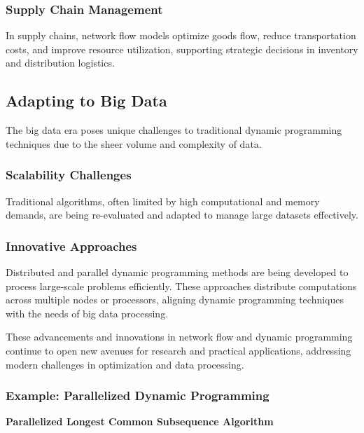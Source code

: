 \documentclass[12pt]{book} %
\begin{document}
\subsubsection{Supply Chain Management}
In supply chains, network flow models optimize goods flow, reduce transportation costs, and improve resource utilization, supporting strategic decisions in inventory and distribution logistics.

\subsection{Adapting to Big Data}
The big data era poses unique challenges to traditional dynamic programming techniques due to the sheer volume and complexity of data.

\subsubsection{Scalability Challenges}
Traditional algorithms, often limited by high computational and memory demands, are being re-evaluated and adapted to manage large datasets effectively.

\subsubsection{Innovative Approaches}
Distributed and parallel dynamic programming methods are being developed to process large-scale problems efficiently. These approaches distribute computations across multiple nodes or processors, aligning dynamic programming techniques with the needs of big data processing.

These advancements and innovations in network flow and dynamic programming continue to open new avenues for research and practical applications, addressing modern challenges in optimization and data processing.

\subsubsection{Example: Parallelized Dynamic Programming}

\textbf{Parallelized Longest Common Subsequence Algorithm}
\end{document}
